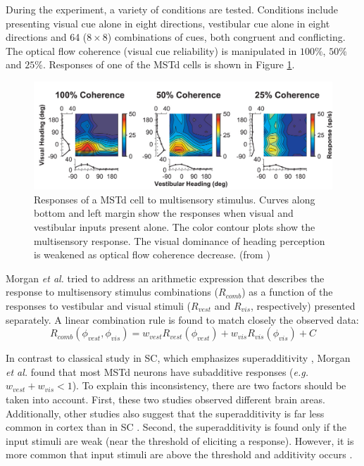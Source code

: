 \documentclass{article}[11pt]
\newcommand{\etal}{\textit{et al. }}
\newcommand{\eg}{\textit{e.g. }}
\begin{document}
During the experiment, a variety of conditions are tested. Conditions include presenting visual cue alone in eight directions, vestibular cue alone in eight directions and 64 ($8 \times 8$) combinations of cues, both congruent and conflicting. The optical flow coherence (visual cue reliability) is manipulated in $100\%$, $50\%$ and $25\%$. Responses of one of the MSTd cells is shown in Figure \ref{fig:coherence}.

\begin{figure}[btp]
  \centering
  \includegraphics[width=\textwidth]{coherence}
  \caption{Responses of a MSTd cell to multisensory stimulus. Curves along bottom and left margin show the responses when visual and vestibular inputs present alone. The color contour plots show the multisensory response. The visual dominance of heading perception is weakened as optical flow coherence decrease. (from \cite{morgan_multisensory_2008})}
  \label{fig:coherence}
\end{figure}

Morgan \etal tried to address an arithmetic expression that describes the response to multisensory stimulus combinations ($R_{comb}$) as a function of the responses to vestibular and visual stimuli ($R_{vest}$ and $R_{vis}$, respectively) presented separately. A linear combination rule is found to match closely the observed data:
\begin{equation}
  R_{comb}(\phi_{vest}, \phi_{vis}) = w_{vest} R_{vest}(\phi_{vest}) + w_{vis} R_{vis}(\phi_{vis}) + C 
  \label{eq:lincomb}
\end{equation}

In contrast to classical study in SC, which emphasizes superadditivity \cite{meredith_visual_1986}, Morgan \etal found that most MSTd neurons have subadditive responses (\eg $w_{vest} + w_{vis} < 1$). To explain this inconsistency, there are two factors should be taken into account. First, these two studies observed different brain areas. Additionally, other studies also suggest that the superadditivity is far less common in cortex than in SC \cite{alais_multisensory_2010}. Second, the superadditivity is found only if the input stimuli are weak (near the threshold of eliciting a response). However, it is more common that input stimuli are above the threshold and additivity occurs \cite{stanford_evaluating_2005}.
\end{document}
